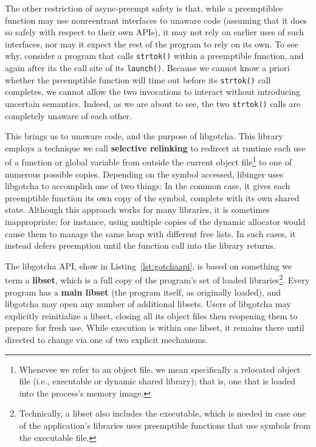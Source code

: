 The other restriction of async-preempt safety is that, while a preemptiblee function
may use nonreentrant interfaces to unaware code (assuming that it does so safely
with respect to their own APIs), it may not rely on earlier uses of such interfaces,
nor may it expect the rest of the program to rely on its own.  To see why, consider a
program that calls \texttt{strtok()} within a preemptible function, and again after
its the call site of its \texttt{launch()}.  Because we cannot know a priori whether
the preemptible function will time out before its \texttt{strtok()} call completes,
we cannot allow the two invocations to interact without introducing uncertain
semantics.  Indeed, as we are about to see, the two \texttt{strtok()} calls are
completely unaware of each other.

This brings us to unaware code, and the purpose of libgotcha.  This library employs
a technique we call \textbf{selective relinking} to redirect at runtime each use of a
function or global variable from outside the current object file\footnote{Whenevee we
refer to an object file, we mean specifically a relocated object file (i.e.,
executable or dynamic shared library); that is, one that is loaded into the process's
memory image.} to one of numerous possible copies.  Depending on the symbol accessed,
libinger uses libgotcha to accomplish one of two things:  In the common case, it
gives each preemptible function its own copy of the symbol, complete with its own
shared state.  Although this approach works for many libraries, it is sometimes
inappropriate; for instance, using multiple copies of the dynamic allocator would
cause them to manage the same heap with different free lists.  In such cases, it
instead defers preemption until the function call into the library returns.

The libgotcha API, show in Listing~\ref{lst:gotchaapi}, is based on something we term
a \textbf{libset}, which is a full copy of the program's set of loaded
libraries\footnote{Technically, a libset also includes the executable, which is
needed in case one of the application's libraries uses preemptible functions that use
symbols from the executable file.}.  Every program has a \textbf{main libset} (the
program itself, as originally loaded), and libgotcha may open any number of
additional libsets.  Users of libgotcha may explicitly reinitialize a libset, closing
all its object files then reopening them to prepare for fresh use.  While execution
is within one libset, it remains there until directed to change via one of two
explicit mechanisms.


